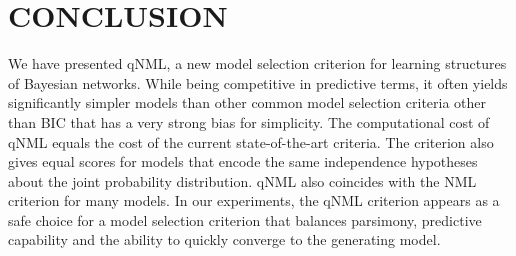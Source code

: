 \section{CONCLUSION}

We have presented qNML, a new model selection criterion for learning
structures of Bayesian networks.  While being competitive in
predictive terms, it often yields significantly simpler models than
other common model selection criteria other than BIC that has a very strong
bias for simplicity. The computational cost of qNML
equals the cost of the current state-of-the-art criteria. The
criterion also gives equal scores for models that encode the same
independence hypotheses about the joint probability distribution.
qNML also coincides with the NML criterion for many models.
In our experiments, the qNML criterion appears as a safe choice for a
model selection criterion that balances
parsimony, predictive capability and the ability to quickly converge to the
generating model.

